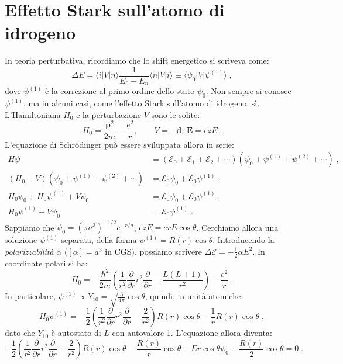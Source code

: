 \documentclass[10pt,a4paper]{report}
\theoremstyle{definition}
\numberwithin{equation}{section}
\newcommand{\bra}{\langle}
\newcommand{\ket}{\rangle}
\newcommand{\Sch}{Schrödinger}
\begin{document}
\section{Effetto Stark sull'atomo di idrogeno}
In teoria perturbativa, ricordiamo che lo shift energetico si scriveva come:
$$
\Delta E=\bra i|V|n\ket\frac{1}{E_0-E_n}\bra n|V|i\ket\equiv \bra \psi_0|V|\psi^{(1)}\ket\;,
$$
dove $\psi^{(1)}$ è la correzione al primo ordine dello stato $\psi_0$. Non sempre si conosce $\psi^{(1)}$, ma in alcuni casi, come l'effetto Stark sull'atomo di idrogeno, sì. L'Hamiltoniana $H_0$ e la perturbazione $V$ sono le solite:
\begin{equation}
H_0=\frac{\mathbf{p}^2}{2m}-\frac{e^2}{r},\qquad V=-\mathbf{d}\cdot\mathbf{E}=ezE\;.
\end{equation}
L'equazione di \Sch\; può essere sviluppata allora in serie:
\begin{align*}
H\psi &= (\mathcal{E}_0+\mathcal{E}_1+\mathcal{E}_2+\cdots)(\psi_0+\psi^{(1)}+\psi^{(2)}+\cdots)\;, \\
(H_0+V)(\psi_0+\psi^{(1)}+\psi^{(2)}+\cdots)&=\mathcal{E}_0\psi_0+\mathcal{E}_0\psi^{(1)}\;, \\
H_0\psi_0+H_0\psi^{(1)}+V\psi_0 &= \mathcal{E}_0\psi_0+\mathcal{E}_0\psi^{(1)}\;, \\
H_0\psi^{(1)}+V\psi_0 &= \mathcal{E}_0\psi^{(1)}\;.
\end{align*}
Sappiamo che $\psi_0=(\pi a^3)^{-1/2}e^{-r/a}$, $ezE=erE\cos\theta$. Cerchiamo allora una soluzione $\psi^{(1)}$ separata, della forma $\psi^{(1)}=R(r)\cos\theta$. Introducendo la \textit{polarizzabilità} $\alpha$ ($[\alpha]=a^3$ in CGS), possiamo scrivere $\Delta\mathcal{E}=-\frac{1}{2}\alpha E^2$. In coordinate polari si ha:
\begin{equation}
H_0=-\frac{\hbar^2}{2m}\left(\frac{1}{r^2}\frac{\partial}{\partial r}r^2\frac{\partial}{\partial r}-\frac{L(L+1)}{r^2}\right)-\frac{e^2}{r}\;.
\end{equation}
In particolare, $\psi^{(1)}\propto Y_{10}=\sqrt{\frac{3}{4\pi}}\cos\theta$, quindi, in unità atomiche:
\begin{equation}
H_0\psi^{(1)}=-\frac{1}{2}\left(\frac{1}{r^2}\frac{\partial}{\partial r}r^2\frac{\partial}{\partial r}-\frac{2}{r^2}\right)R(r)\cos\theta-\frac{1}{r}R(r)\cos\theta\;,
\end{equation}
dato che $Y_{10}$ è autostato di $L$ con autovalore 1. L'equazione allora diventa:
\begin{equation}
-\frac{1}{2}\left(\frac{1}{r^2}\frac{\partial}{\partial r}r^2\frac{\partial}{\partial r}-\frac{2}{r^2}\right)R(r)\cos\theta-\frac{R(r)}{r}\cos\theta+Er\cos\theta\psi_0+\frac{R(r)}{2}\cos\theta=0\;.
\end{equation}
\end{document}
